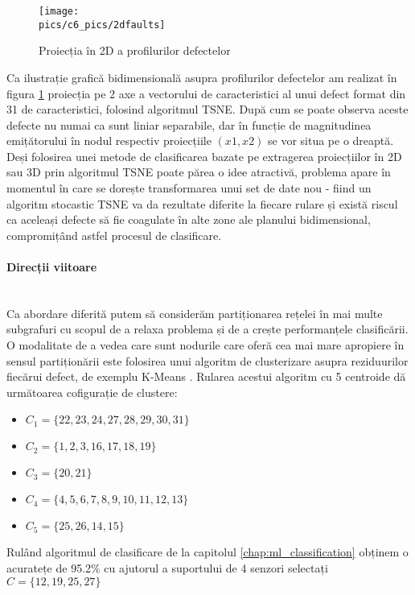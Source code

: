 \begin{figure}[H]
\centering
\texttt{[image: \\pics/c6\_pics/2dfaults]}
\caption{Proiecția în 2D a profilurilor defectelor}
\label{fig:tsne_faults}
\end{figure}

Ca ilustrație grafică bidimensională asupra profilurilor defectelor am realizat în figura \ref{fig:tsne_faults} proiecția pe 2 axe a vectorului de caracteristici al unui defect format din 31 de caracteristici, folosind algoritmul TSNE. După cum se poate observa aceste defecte nu numai ca sunt liniar separabile, dar în funcție de magnitudinea emițătorului în nodul respectiv proiecțiile $(x1, x2)$ se vor situa pe o dreaptă. Deși folosirea unei metode de clasificarea bazate pe extragerea proiecțiilor în 2D sau 3D prin algoritmul TSNE poate părea o idee atractivă, problema apare în momentul în care se dorește transformarea unui set de date nou - fiind un algoritm stocastic TSNE va da rezultate diferite la fiecare rulare și există riscul ca aceleași defecte să fie coagulate în alte zone ale planului bidimensional, compromițând astfel procesul de clasificare.


\paragraph{Direcții viitoare} \mbox{} \\

Ca abordare diferită putem să considerăm partiționarea rețelei în mai multe subgrafuri \cite{irofti2017dictionary}  cu scopul de a relaxa problema și de a crește performanțele clasificării. O modalitate de a vedea care sunt nodurile care oferă cea mai mare apropiere în sensul partiționării este folosirea unui algoritm de clusterizare asupra reziduurilor fiecărui defect, de exemplu K-Means \cite{k-means}. Rularea acestui algoritm cu 5 centroide dă următoarea cofigurație de clustere:

\begin{itemize}
    \item $C_1 = \{22, 23, 24, 27, 28, 29, 30, 31\}$
    \item $C_2 = \{1, 2, 3, 16, 17, 18, 19\}$
    \item $C_3 = \{  20, 21\}$
    \item $C_4 = \{ 4, 5, 6, 7, 8, 9, 10, 11, 12, 13\}$
    \item $C_5 = \{ 25, 26, 14, 15\}$
\end{itemize}

Rulând algoritmul de clasificare de la capitolul \ref{chap:ml_classification} obținem o acuratețe de 95.2\% cu ajutorul a suportului de 4 senzori selectați $C=\{12, 19, 25, 27\}$




